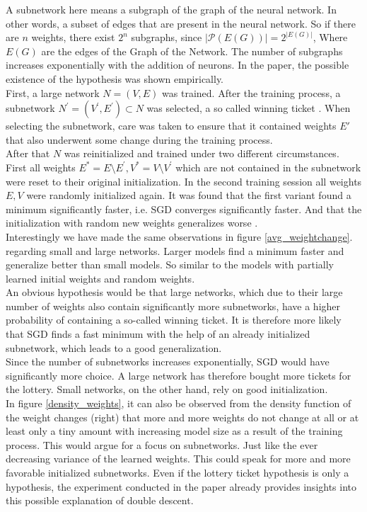 A subnetwork here means a subgraph of the graph of the neural network. In other words, a subset of edges that are present in the neural network.  
So if there are $n$ weights, there exist $2^n$ subgraphs, since $|\mathcal{P}(E(G))| = 2^{|E(G)|}$, Where $E(G)$ are the edges of the Graph of the Network. The number of subgraphs increases exponentially with the addition of neurons. In the paper, the possible existence of the hypothesis was shown empirically. \\
First, a large network $N = (V,E)$ was trained. After the training process, a subnetwork
$N^{'} =  (V^{'},E^{'})\subset N$ was selected, a so called winning ticket \cite{lottery_ticket}. When selecting the subnetwork, care was taken to ensure that it contained weights $E{'}$ that also underwent some change during the training process. \\
After that $N$ was reinitialized and trained under two different circumstances. First all weights $E^* = E \setminus E^{'}, V^* = V \setminus V^{'}$ which are not contained in the subnetwork were reset to their original initialization. In the second training session all weights $E,V$ were randomly initialized again. It was found that the first variant found a minimum significantly faster, i.e. SGD converges significantly faster. And that the initialization with random new weights generalizes worse \cite{lottery_ticket}. \\
Interestingly we have made the same observations in figure \ref{avg_weightchange}. regarding small and large networks. Larger models find a minimum faster  and generalize better than small models. So similar to the models with partially learned initial weights and random weights.\\
An obvious hypothesis would be that large networks, which due to their large number of weights also contain significantly more subnetworks, have a higher probability of containing a so-called winning ticket. It is therefore more likely that SGD finds a fast minimum with the help of an already initialized subnetwork, which leads to a good generalization. \\
Since the number of subnetworks increases exponentially, SGD would have significantly more choice. A large network has therefore bought more tickets for the lottery. Small networks, on the other hand, rely on good initialization. \\
In figure \ref{density_weights}, it can also be observed from the density function of the weight changes (right) that more and more weights do not change at all or at least only a tiny amount with increasing model size as a result of the training process. This would argue for a focus on subnetworks. Just like the ever decreasing variance of the learned weights. This could speak for more and more favorable initialized subnetworks. Even if the lottery ticket hypothesis is only a hypothesis, the experiment conducted in the paper already provides insights into this possible explanation of double descent.
